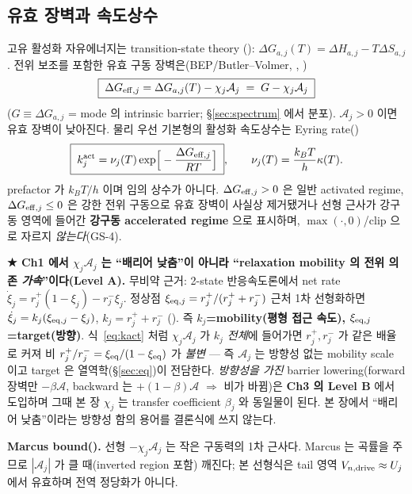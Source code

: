 \subsection{유효 장벽과 속도상수}
고유 활성화 자유에너지는 transition-state theory \cite{eyring1935,evanspolanyi1938}():
$\Delta G_{a,j}(T)=\Delta H_{a,j}-T\Delta S_{a,j}$. 전위 보조를 포함한 유효 구동 장벽은(BEP/Butler--Volmer,
, \cite{evanspolanyi1938,bardfaulkner})
\begin{equation}
\boxed{\;\Delta G_{\mathrm{eff},j}=\Delta G_{a,j}(T)-\chi_j\mathcal A_j\;=\;G-\chi_j\mathcal A_j\;}
\label{eq:Geff}
\end{equation}
($G\equiv\Delta G_{a,j}$ = mode 의 intrinsic barrier; \S\ref{sec:spectrum} 에서 분포). $\mathcal A_j>0$
이면 유효 장벽이 낮아진다. 물리 우선 기본형의 활성화 속도상수는 Eyring rate()
\begin{equation}
\boxed{\;k_j^\mathrm{act}=\nu_j(T)\exp\!\Big[-\frac{\Delta G_{\mathrm{eff},j}}{RT}\Big]\;},\qquad
\nu_j(T)=\frac{k_BT}{h}\kappa(T).
\label{eq:kact}
\end{equation}
prefactor 가 $k_BT/h$ 이며 임의 상수가 아니다. $\Delta G_{\mathrm{eff},j}>0$ 은 일반 activated regime,
$\Delta G_{\mathrm{eff},j}\le0$ 은 강한 전위 구동으로 유효 장벽이 사실상 제거됐거나 선형 근사가 강구동 영역에
들어간 \textbf{강구동 accelerated regime} 으로 표시하며, $\max(\cdot,0)$/clip 으로 자르지 \emph{않는다}(GS-4).

\begin{keybox}
\textbf{★ Ch1 에서 $\chi_j\mathcal A_j$ 는 ``배리어 낮춤''이 아니라 ``relaxation mobility 의 전위 의존
\emph{가속}''이다(Level A).} 무비약 근거: 2-state 반응속도론에서 net rate
$\dot\xi_j=r_j^+(1-\xi_j)-r_j^-\xi_j$. 정상점 $\xi_{\mathrm{eq},j}=r_j^+/(r_j^++r_j^-)$ 근처 1차 선형화하면
$\dot\xi_j=k_j(\xi_{\mathrm{eq},j}-\xi_j)$, $k_j=r_j^++r_j^-$ (). 즉 \textbf{$k_j$=mobility(평형 접근
속도), $\xi_{\mathrm{eq},j}$=target(방향)}. 식~\eqref{eq:kact} 처럼 $\chi_j\mathcal A_j$ 가 \emph{$k_j$ 전체}에
들어가면 $r_j^+,r_j^-$ 가 같은 배율로 커져 비 $r_j^+/r_j^-=\xi_{\mathrm{eq}}/(1-\xi_{\mathrm{eq}})$ 가 \emph{불변} — 즉
$\mathcal A_j$ 는 방향성 없는 mobility scale 이고 target 은 열역학(\S\ref{sec:eq})이 전담한다. \emph{방향성을
가진} barrier lowering(forward 장벽만 $-\beta\mathcal A$, backward 는 $+(1-\beta)\mathcal A$ $\Rightarrow$
비가 바뀜)은 \textbf{Ch3 의 Level B} 에서 도입하며 그때 본 장 $\chi_j$ 는 transfer coefficient $\beta_j$
와 동일물이 된다. 본 장에서 ``배리어 낮춤''이라는 방향성 함의 용어를 결론식에 쓰지 않는다.
\end{keybox}
\begin{boundbox}
\textbf{Marcus bound().} 선형 $-\chi_j\mathcal A_j$ 는 작은 구동력의 1차 근사다. Marcus
\cite{marcus1956} 는 곡률을 주므로 $|\mathcal A_j|$ 가 클 때(inverted region 포함) 깨진다; 본 선형식은
tail 영역 $V_{n,\mathrm{drive}}\approx U_j$ 에서 유효하며 전역 정당화가 아니다.
\end{boundbox}

